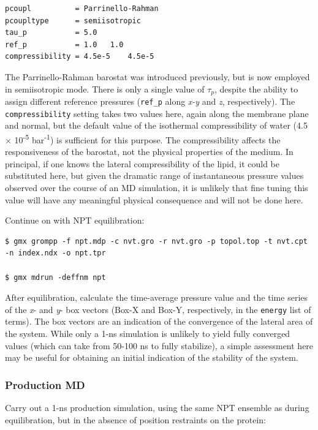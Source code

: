 \documentclass[9pt,tutorial,pubversion]{livecoms}
\begin{document}
\begin{lstlisting}
pcoupl          = Parrinello-Rahman
pcoupltype      = semiisotropic
tau_p           = 5.0
ref_p           = 1.0   1.0
compressibility = 4.5e-5    4.5e-5
\end{lstlisting}

The Parrinello-Rahman barostat was introduced previously, but is now employed in semiisotropic mode. There is only a single value of $\tau_p$, despite the ability to assign different reference pressures (\texttt{ref\_p} along {\em x-y} and {\em z}, respectively). The \texttt{compressibility} setting takes two values here, again along the membrane plane and normal, but the default value of the isothermal compressibility of water (4.5 $\times$ 10\textsuperscript{-5} bar\textsuperscript{-1}) is sufficient for this purpose. The compressibility affects the responsiveness of the barostat, not the physical properties of the medium. In principal, if one knows the lateral compressibility of the lipid, it could be substituted here, but given the dramatic range of instantaneous pressure values observed over the course of an MD simulation, it is unlikely that fine tuning this value will have any meaningful physical consequence and will not be done here.

Continue on with NPT equilibration:

\begin{lstlisting}
$ gmx grompp -f npt.mdp -c nvt.gro -r nvt.gro -p topol.top -t nvt.cpt -n index.ndx -o npt.tpr

$ gmx mdrun -deffnm npt
\end{lstlisting}

After equilibration, calculate the time-average pressure value and the time series of the {\em x}- and {\em y}- box vectors (Box-X and Box-Y, respectively, in the \texttt{energy} list of terms). The box vectors are an indication of the convergence of the lateral area of the system. While only a 1-ns simulation is unlikely to yield fully converged values (which can take from 50-100 ns to fully stabilize), a simple assessment here may be useful for obtaining an initial indication of the stability of the system.

\subsubsection{Production MD} \label{kalp_md}

Carry out a 1-ns production simulation, using the same NPT ensemble as during equilibration, but in the absence of position restraints on the protein:
\end{document}

